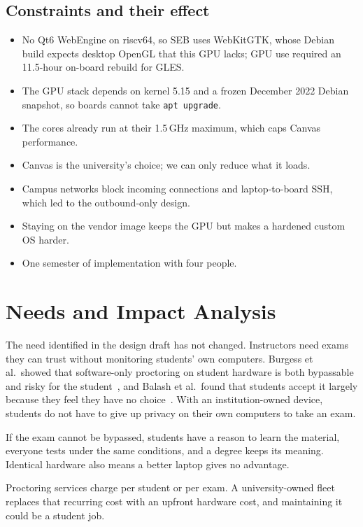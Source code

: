\documentclass[11pt]{article}
\begin{document}
\subsection{Constraints and their effect}
\begin{itemize}
  \item No Qt6 WebEngine on riscv64, so SEB uses WebKitGTK, whose Debian build expects desktop OpenGL that this GPU lacks; GPU use required an 11.5-hour on-board rebuild for GLES.
  \item The GPU stack depends on kernel 5.15 and a frozen December 2022 Debian snapshot, so boards cannot take \texttt{apt upgrade}.
  \item The cores already run at their 1.5\,GHz maximum, which caps Canvas performance.
  \item Canvas is the university's choice; we can only reduce what it loads.
  \item Campus networks block incoming connections and laptop-to-board SSH, which led to the outbound-only design.
  \item Staying on the vendor image keeps the GPU but makes a hardened custom OS harder.
  \item One semester of implementation with four people.
\end{itemize}

\section{Needs and Impact Analysis}
\label{sec:impact}

The need identified in the design draft has not changed. Instructors need exams they can trust without monitoring students' own computers. Burgess et al.\ showed that software-only proctoring on student hardware is both bypassable and risky for the student~\cite{burgess2022}, and Balash et al.\ found that students accept it largely because they feel they have no choice~\cite{balash2021}. With an institution-owned device, students do not have to give up privacy on their own computers to take an exam.

If the exam cannot be bypassed, students have a reason to learn the material, everyone tests under the same conditions, and a degree keeps its meaning. Identical hardware also means a better laptop gives no advantage.

Proctoring services charge per student or per exam. A university-owned fleet replaces that recurring cost with an upfront hardware cost, and maintaining it could be a student job.
\end{document}
